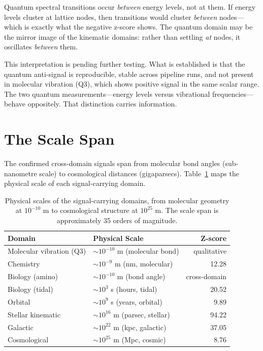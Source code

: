 \documentclass[11pt, letterpaper, openany]{book}
\begin{document}
Quantum spectral transitions occur \emph{between} energy levels, not at them. If energy
levels cluster at lattice nodes, then transitions would cluster \emph{between} nodes---which
is exactly what the negative z-score shows. The quantum domain may be the mirror image of
the kinematic domains: rather than settling \emph{at} nodes, it oscillates \emph{between} them.

This interpretation is pending further testing. What is established is that the quantum
anti-signal is reproducible, stable across pipeline runs, and not present in molecular
vibration (Q3), which shows positive signal in the same scalar range. The two quantum
measurements---energy levels versus vibrational frequencies---behave oppositely. That
distinction carries information.

\section*{The Scale Span}

The confirmed cross-domain signals span from molecular bond angles (sub-nanometre scale) to
cosmological distances (gigaparsecs). Table~\ref{tab:scalespan} maps the physical scale of
each signal-carrying domain.

\begin{table}[H]
\centering
\renewcommand{\arraystretch}{1.3}
\begin{tabular}{|l|l|r|}
\hline
\textbf{Domain} & \textbf{Physical Scale} & \textbf{Z-score} \\
\hline\hline
Molecular vibration (Q3) & $\sim 10^{-10}$ m (molecular bond) & qualitative \\
Chemistry & $\sim 10^{-9}$ m (nm, molecular) & 12.28 \\
Biology (amino) & $\sim 10^{-10}$ m (bond angle) & cross-domain \\
Biology (tidal) & $\sim 10^{3}$ s (hours, tidal) & 20.52 \\
Orbital & $\sim 10^{9}$ s (years, orbital) & 9.89 \\
Stellar kinematic & $\sim 10^{16}$ m (parsec, stellar) & 94.22 \\
Galactic & $\sim 10^{22}$ m (kpc, galactic) & 37.05 \\
Cosmological & $\sim 10^{25}$ m (Mpc, cosmic) & 8.76 \\
\hline
\end{tabular}
\caption{Physical scales of the signal-carrying domains, from molecular geometry at
$10^{-10}$ m to cosmological structure at $10^{25}$ m. The scale span is approximately
35 orders of magnitude.}
\label{tab:scalespan}
\end{table}
\end{document}
